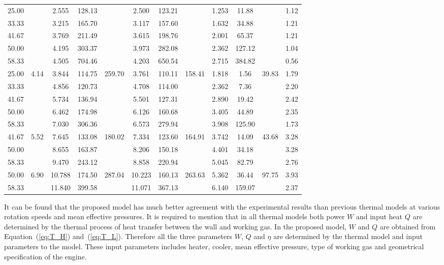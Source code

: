 \begin{table}
\begin{center}
\begin{tabular}{cccccccccccc}
		25.00	&&2.555	&128.13	&&2.500	&123.21	&&1.253	&11.88	&&1.12\\
		33.33	&&3.215	&165.70	&&3.117	&157.60	&&1.632	&34.88	&&1.21\\
		41.67	&&3.769	&211.49	&&3.615	&198.76	&&2.001	&65.37	&&1.21\\
		50.00	&&4.195	&303.37	&&3.973	&282.08	&&2.362	&127.12	&&1.04\\
		58.33	&&4.505	&704.46	&&4.203	&650.54	&&2.715	&384.82	&&0.56\\
		\midrule
		25.00	&\multirow{5}{*}{4.14}	&3.844	&114.75	&\multirow{5}{*}{259.70}	&3.761	&110.11	&\multirow{5}{*}{158.41}	&1.818	&1.56	&\multirow{5}{*}{39.83}	&1.79\\
		33.33	&&4.856	&120.73	&&4.708	&114.00	&&2.362	&7.36	&&2.20\\
		41.67	&&5.734	&136.94	&&5.501	&127.31	&&2.890	&19.42	&&2.42\\
		50.00	&&6.462	&174.98	&&6.126	&160.68	&&3.405	&44.89	&&2.35\\
		58.33	&&7.030	&306.36	&&6.573	&279.94	&&3.908	&125.90	&&1.73\\
		\midrule
		41.67	&\multirow{3}{*}{5.52}	&7.645	&133.08	&\multirow{3}{*}{180.02}	&7.334	&123.60	&\multirow{3}{*}{164.91}	&3.742	&14.09	&\multirow{3}{*}{43.68}	&3.28\\
		50.00	&&8.655	&163.87	&&8.206	&150.18	&&4.401	&34.18	&&3.28\\
		58.33	&&9.470	&243.12	&&8.858	&220.94	&&5.045	&82.79	&&2.76\\
		\midrule
		50.00	&\multirow{2}{*}{6.90}	&10.788	&174.50	&\multirow{2}{*}{287.04}	&10.223	&160.13	&\multirow{2}{*}{263.63}	&5.362	&36.44	&\multirow{2}{*}{97.75}		&3.93\\
		58.33	&&11.840	&399.58	&&11.071	&367.13	&&6.140	&159.07	&&2.37\\
		\bottomrule
	\end{tabular}
	\end{center}
	\label{tab:PowerComparison}
\end{table}

It can be found that the proposed model has much better agreement with the experimental results than previous thermal models at various rotation speeds and mean effective pressures. It is required to mention that in all thermal models both power $W$ and input heat $Q$ are determined by the thermal process of heat transfer between the wall and working gas. In the proposed model, $W$ and $Q$ are obtained from Equation~(\ref{eq:T_H}) and~(\ref{eq:T_L}). Therefore all the three parameters $W$, $Q$ and $\eta$ are determined by the thermal model and input parameters to the model. These input parameters includes heater, cooler, mean effective pressure, type of working gas and geometrical specification of the engine.

